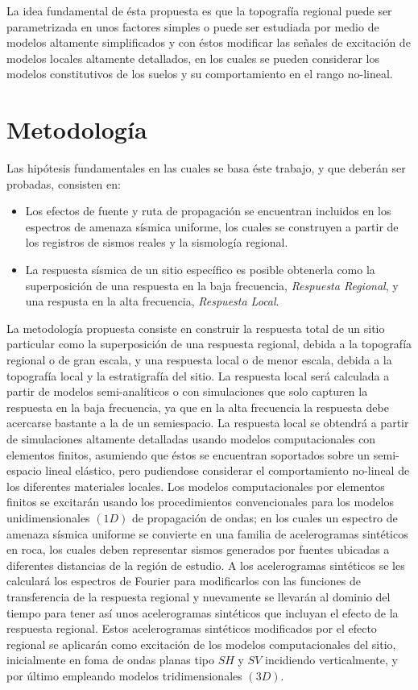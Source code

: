 \documentclass[spanish,letterpaper,12pt,twoside,openany]{article}
\begin{document}
La idea fundamental de ésta propuesta es que la topografía regional puede ser parametrizada en unos factores simples o puede ser estudiada por medio de modelos altamente simplificados y con éstos modificar las señales de excitación de modelos locales altamente detallados, en los cuales se pueden considerar los modelos constitutivos de los suelos y su comportamiento en el rango no-lineal.
%
%
%
%
%
\section{Metodología}
%
Las hipótesis fundamentales en las cuales se basa éste trabajo, y que deberán ser probadas, consisten en:
%
\begin{itemize}
%
	\item Los efectos de fuente y ruta de propagación se encuentran incluidos en los espectros de amenaza sísmica uniforme, los cuales se construyen a partir de los registros de sismos reales y la sismología regional.
	\item La respuesta sísmica de un sitio específico es posible obtenerla como la superposición de una respuesta en la baja frecuencia, \textit{Respuesta Regional}, y una respusta en la alta frecuencia, \textit{Respuesta Local}.
	\vspace{-.5 cm}
%
\end{itemize}
%
La metodología propuesta consiste en construir la respuesta total de un sitio particular como la superposición de una respuesta regional, debida a la topografía regional o de gran escala, y una respuesta local o de menor escala, debida a la topografía local y la estratigrafía del sitio. La respuesta local será calculada a partir de modelos semi-analíticos o con simulaciones que solo capturen la respuesta en la baja frecuencia, ya que en la alta frecuencia la respuesta debe acercarse bastante a la de un semiespacio. La respuesta local se obtendrá a partir de simulaciones altamente detalladas usando modelos computacionales con elementos finitos, asumiendo que éstos se encuentran soportados sobre un semi-espacio lineal elástico, pero pudiendose considerar el comportamiento no-lineal de los diferentes materiales locales. Los modelos computacionales por elementos finitos se excitarán usando los procedimientos convencionales para los modelos unidimensionales $\left( 1D \right)$ de propagación de ondas; en los cuales un espectro de amenaza sísmica uniforme se convierte en una familia de acelerogramas sintéticos en roca, los cuales deben representar sismos generados por fuentes ubicadas a diferentes distancias de la región de estudio. A los acelerogramas sintéticos se les calculará los espectros de Fourier para modificarlos con las funciones de transferencia de la respuesta regional y nuevamente se llevarán al dominio del tiempo para tener así unos acelerogramas sintéticos que incluyan el efecto de la respuesta regional. Estos acelerogramas sintéticos modificados por el efecto regional se aplicarán como excitación de los modelos computacionales del sitio, inicialmente en foma de ondas planas tipo $SH$ y $SV$ incidiendo verticalmente, y por último empleando modelos tridimensionales $\left( 3D \right)$.\\
\end{document}
